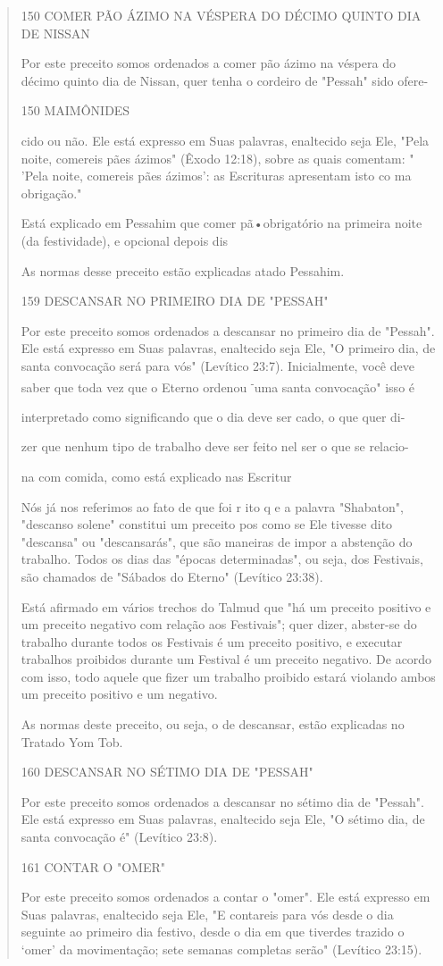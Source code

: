 \begin{quote}
150 COMER PÃO ÁZIMO NA VÉSPERA DO DÉCIMO QUINTO DIA DE NISSAN

Por este preceito somos ordenados a comer pão ázimo na véspera do décimo
quinto dia de Nissan, quer tenha o cordeiro de "Pessah" sido ofere-

150 MAIMÔNIDES

cido ou não. Ele está expresso em Suas palavras, enaltecido seja Ele,
"Pela noi­te, comereis pães ázimos" (Êxodo 12:18), sobre as quais
comentam: " 'Pela noite, comereis pães ázimos': as Escrituras apresentam
isto co ma obrigação."

Está explicado em Pessahim que comer pã•obrigatório na primeira noite
(da festividade), e opcional depois dis

As normas desse preceito estão explicadas atado Pessahim.

159 DESCANSAR NO PRIMEIRO DIA DE "PESSAH"

Por este preceito somos ordenados a descansar no primeiro dia de
"Pessah". Ele está expresso em Suas palavras, enaltecido seja Ele, "O
primeiro dia, de santa convocação será para vós" (Levítico 23:7).
Inicialmente, você de­ve saber que toda vez que o Eterno ordenou
\textsuperscript{-}uma santa convocação" isso é

interpretado como significando que o dia deve ser cado, o que quer di-

zer que nenhum tipo de trabalho deve ser feito nel ser o que se relacio-

na com comida, como está explicado nas Escritur

Nós já nos referimos ao fato de que foi r ito q e a palavra "Shaba­ton",
"descanso solene" constitui um preceito pos como se Ele tivesse dito
"descansa" ou "descansarás", que são maneiras de impor a abstenção do
trabalho. Todos os dias das "épocas determinadas", ou seja, dos
Festivais, são chamados de "Sábados do Eterno" (Levítico 23:38).

Está afirmado em vários trechos do Talmud que "há um preceito po­sitivo
e um preceito negativo com relação aos Festivais"; quer dizer, abster-se
do trabalho durante todos os Festivais é um preceito positivo, e
executar traba­lhos proibidos durante um Festival é um preceito
negativo. De acordo com is­so, todo aquele que fizer um trabalho
proibido estará violando ambos um pre­ceito positivo e um negativo.

As normas deste preceito, ou seja, o de descansar, estão explicadas no
Tratado Yom Tob.

160 DESCANSAR NO SÉTIMO DIA DE "PESSAH"

Por este preceito somos ordenados a descansar no sétimo dia de
"Pes­sah". Ele está expresso em Suas palavras, enaltecido seja Ele, "O
sétimo dia, de santa convocação é" (Levítico 23:8).

161 CONTAR O "OMER"

Por este preceito somos ordenados a contar o "omer". Ele está ex­presso
em Suas palavras, enaltecido seja Ele, "E contareis para vós desde o dia
seguinte ao primeiro dia festivo, desde o dia em que tiverdes trazido o
`omer' da movimentação; sete semanas completas serão" (Levítico 23:15).
\end{quote}

